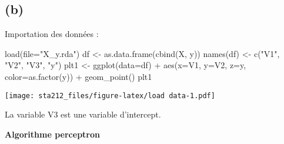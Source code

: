 \documentclass[
]{article}
\newenvironment{Shaded}{\begin{snugshade}}{\end{snugshade}}
\newcommand{\AttributeTok}[1]{\textcolor[rgb]{0.77,0.63,0.00}{#1}}
\newcommand{\FunctionTok}[1]{\textcolor[rgb]{0.00,0.00,0.00}{#1}}
\newcommand{\NormalTok}[1]{#1}
\newcommand{\OtherTok}[1]{\textcolor[rgb]{0.56,0.35,0.01}{#1}}
\newcommand{\SpecialCharTok}[1]{\textcolor[rgb]{0.00,0.00,0.00}{#1}}
\newcommand{\StringTok}[1]{\textcolor[rgb]{0.31,0.60,0.02}{#1}}
\begin{document}
\hypertarget{b-1}{%
\subsection{(b)}\label{b-1}}

Importation des données :

\begin{Shaded}
\begin{Highlighting}[]
\FunctionTok{load}\NormalTok{(}\AttributeTok{file=}\StringTok{"X\_y.rda"}\NormalTok{)}
\NormalTok{df }\OtherTok{\textless{}{-}} \FunctionTok{as.data.frame}\NormalTok{(}\FunctionTok{cbind}\NormalTok{(X, y))}
\FunctionTok{names}\NormalTok{(df) }\OtherTok{\textless{}{-}} \FunctionTok{c}\NormalTok{(}\StringTok{"V1"}\NormalTok{, }\StringTok{"V2"}\NormalTok{, }\StringTok{"V3"}\NormalTok{, }\StringTok{"y"}\NormalTok{)}
\NormalTok{plt1 }\OtherTok{\textless{}{-}} \FunctionTok{ggplot}\NormalTok{(}\AttributeTok{data=}\NormalTok{df) }\SpecialCharTok{+} \FunctionTok{aes}\NormalTok{(}\AttributeTok{x=}\NormalTok{V1, }\AttributeTok{y=}\NormalTok{V2, }\AttributeTok{z=}\NormalTok{y, }\AttributeTok{color=}\FunctionTok{as.factor}\NormalTok{(y)) }\SpecialCharTok{+} \FunctionTok{geom\_point}\NormalTok{()}
\NormalTok{plt1}
\end{Highlighting}
\end{Shaded}

\texttt{[image: sta212\_files/figure-latex/load data-1.pdf]}

La variable V3 est une variable d'intercept.

\textbf{Algorithme perceptron}
\end{document}
